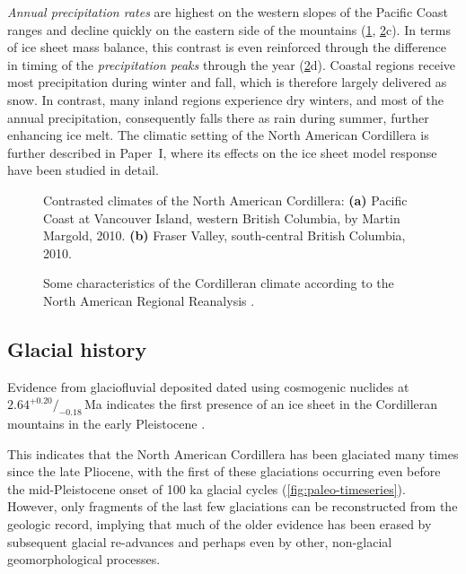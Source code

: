 \documentclass{article}
\newcommand{\CCLI}[0]{Paper~I}      %
\newcommand{\subgraphics}[3][,]{%
  \setbox1=\hbox{\texttt{[image: \#3]}}%
  \leavevmode\rlap{\usebox1}%
  \rlap{\hspace*{0.25em}
        \raisebox{\dimexpr\ht1-3ex}{\textbf{(#2)}}}%
  \phantom{\usebox1}%
}
\begin{document}
\emph{Annual precipitation rates} are highest on the western slopes of the
Pacific Coast ranges and decline quickly on the eastern side of the mountains
(\cref{fig:photo-fraser-valley}, \cref{fig:plot-atm}c). In terms of ice sheet
mass balance, this contrast is even reinforced through the difference in timing
of the \emph{precipitation peaks} through the year (\cref{fig:plot-atm}d).
Coastal regions receive most precipitation during winter and fall, which is
therefore largely delivered as snow. In contrast, many inland regions
experience dry winters, and most of the annual precipitation, consequently
falls there as rain during summer, further enhancing ice melt. The climatic
setting of the North American Cordillera is further described in \CCLI, where
its effects on the ice sheet model response have been studied in detail.

\begin{figure}
  \centering
  \makebox[0pt]{
    \subgraphics{a}{photo-vancouver-island}
    \hspace{1cm}
    \subgraphics{b}{photo-fraser-valley}
  }
  \caption{Contrasted climates of the North American Cordillera:
           \textbf{(a)} Pacific Coast at Vancouver Island, western British
           Columbia, by Martin Margold, 2010.
           \textbf{(b)} Fraser Valley, south-central British Columbia, 2010.}
  \label{fig:photo-fraser-valley}
\end{figure}

\begin{figure}
  \centering
  \caption{Some characteristics of the Cordilleran climate according to the
           North American Regional Reanalysis
           \citep[NARR,][]{Mesinger.etal.2006}.}
  \label{fig:plot-atm}
\end{figure}


\subsection{Glacial history}

Evidence from glaciofluvial deposited dated using cosmogenic nuclides at $2.64^{+0.20}/_{-0.18}$\,Ma indicates the first presence of an ice sheet in the Cordilleran mountains in the early Pleistocene
\citep{Hidy.etal.2013}.

This indicates that the North American Cordillera has
been glaciated many times since the late Pliocene, with the first of these glaciations occurring even before the mid-Pleistocene
onset of 100 ka glacial cycles (\cref{fig:paleo-timeseries}). However, only fragments of
the last few glaciations can be reconstructed from the geologic record, implying that
much of the older evidence has been erased by subsequent glacial
re-advances and perhaps even by other, non-glacial geomorphological processes.
\end{document}
